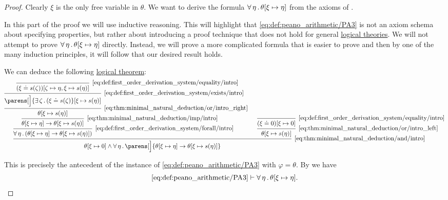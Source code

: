 \begin{proof}
  Clearly \( \xi \) is the only free variable in \( \theta \). We want to derive the formula \( \forall \thinspace \eta \thinspace . \thinspace \theta[\xi \mapsto \eta] \) from the axioms of .

  In this part of the proof we will use inductive reasoning. This will highlight that \eqref{eq:def:peano_arithmetic/PA3} is not an axiom schema about specifying properties, but rather about introducing a proof technique that does not hold for general \hyperref[def:first_order_theory]{logical theories}. We will not attempt to prove \( \forall \thinspace \eta \thinspace . \thinspace \theta[\xi \mapsto \eta] \) directly. Instead, we will prove a more complicated formula that is easier to prove and then by one of the many induction principles, it will follow that our desired result holds.

  We can deduce the following \hyperref[def:derivation_system_derivability]{logical theorem}:
  \begin{equation*}
    \begin{prooftree}
      \infer0[\eqref{eq:def:first_order_derivation_system/equality/intro}]{ (\xi \doteq s(\zeta))[\zeta \mapsto \eta, \xi \mapsto s(\eta)] }
      \infer1[\eqref{eq:def:first_order_derivation_system/exists/intro}]{ \parens[\Big]{ \qexists \zeta (\xi \doteq s(\zeta) }[\xi \mapsto s(\eta)] }
      \infer1[\eqref{eq:thm:minimal_natural_deduction/or/intro_right}]{ \theta[\xi \mapsto s(\eta)] }
      \infer1[\eqref{eq:thm:minimal_natural_deduction/imp/intro}]{ \theta[\xi \mapsto \eta] \rightarrow \theta[\xi \mapsto s(\eta)] }
      \infer1[\eqref{eq:def:first_order_derivation_system/forall/intro}]{ \qforall \eta (\theta[\xi \mapsto \eta] \rightarrow \theta[\xi \mapsto s(\eta)]) }

      \infer0[\eqref{eq:def:first_order_derivation_system/equality/intro}]{ (\xi \doteq 0)[\xi \mapsto 0] }
      \infer1[\eqref{eq:thm:minimal_natural_deduction/or/intro_left}]{ \theta[\xi \mapsto s(\eta)] }

      \infer2[\eqref{eq:thm:minimal_natural_deduction/and/intro}]{ \theta[\xi \mapsto 0] \wedge \qforall \eta \parens[\Big] { \theta[\xi \mapsto \eta] \rightarrow \theta[\xi \mapsto s(\eta)] } }
    \end{prooftree}
  \end{equation*}

  This is precisely the antecedent of the instance of \eqref{eq:def:peano_arithmetic/PA3} with \( \varphi = \theta \). By  we have
  \begin{equation*}
    \eqref{eq:def:peano_arithmetic/PA3} \vdash \forall \thinspace \eta \thinspace . \thinspace \theta[\xi \mapsto \eta].
  \end{equation*}


\end{proof}
